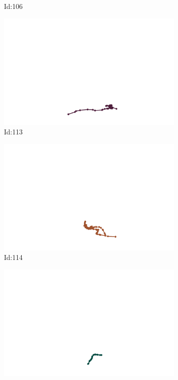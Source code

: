 \documentclass[12pt,twoside]{report}
\begin{document}
\begin{figure}
\begin{subfigure}[b]{0.20\textwidth}
\caption{Id:106}
\end{subfigure}
\begin{subfigure}[b]{0.20\textwidth}
\centering
\includegraphics[width=\textwidth]{../trajectories/113.png}
\caption{Id:113}
\end{subfigure}
\begin{subfigure}[b]{0.20\textwidth}
\centering
\includegraphics[width=\textwidth]{../trajectories/114.png}
\caption{Id:114}
\end{subfigure}
\begin{subfigure}[b]{0.20\textwidth}
\centering
\includegraphics[width=\textwidth]{../trajectories/115.png}

\end{subfigure}
\end{figure}
\end{document}
